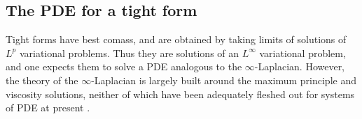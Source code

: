 \documentclass[reqno,11pt]{amsart}
\newcommand{\RR}{\mathbf{R}}
\newcommand{\Mass}{\mathbf M}
\newcommand{\dfn}[1]{\emph{#1}\index{#1}}
\newtheorem{mainthm}{Theorem}
\theoremstyle{definition}
\numberwithin{equation}{section}
\begin{document}





\subsection{The PDE for a tight form}
Tight forms have best comass, and are obtained by taking limits of solutions of $L^p$ variational problems.
Thus they are solutions of an $L^\infty$ variational problem, and one expects them to solve a PDE analogous to the $\infty$-Laplacian.
However, the theory of the $\infty$-Laplacian is largely built around the maximum principle and viscosity solutions, neither of which have been adequately fleshed out for systems of PDE at present \cite{Katzourakis2018OnAV,Sheffield12}.
\end{document}
